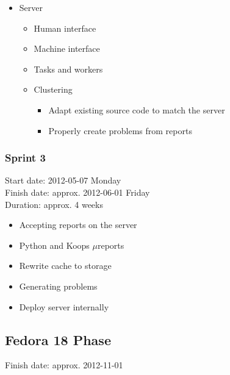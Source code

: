 \documentclass{article}
\begin{document}
\begin{itemize}
\item Server
  \begin{itemize}
  \item Human interface
  \item Machine interface
  \item Tasks and workers
  \item Clustering
    \begin{itemize}
      \item Adapt existing source code to match the server
      \item Properly create problems from reports
    \end{itemize}
  \end{itemize}
\end{itemize}

\cleardoublepage
\subsubsection{Sprint 3}
Start date: 2012-05-07 Monday \\
Finish date: approx. 2012-06-01 Friday \\
Duration: approx. 4 weeks

\begin{itemize}
\item Accepting reports on the server
\item Python and Koops $\mu$reports
\item Rewrite cache to storage
\item Generating problems
\item Deploy server internally
\end{itemize}

\cleardoublepage
\subsection{Fedora 18 Phase}
Finish date: approx. 2012-11-01
\end{document}
